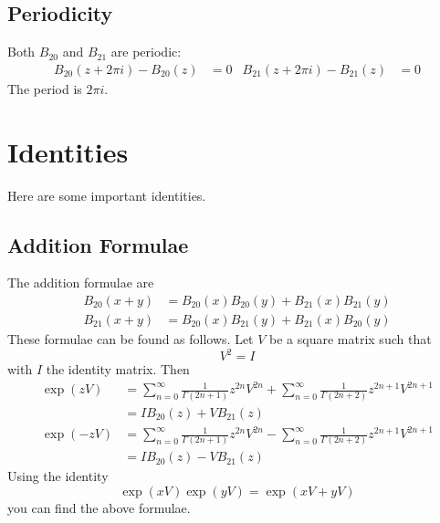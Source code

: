 \subsection{Periodicity}
Both $B_{20}$ and $B_{21}$ are periodic:
\begin{align}
    B_{20}(z + 2\pi i) - B_{20}(z) &= 0 & B_{21}(z + 2\pi i) - B_{21}(z) &= 0
\end{align}
The period is $2\pi i$.
\section{Identities}
Here are some important identities.
\subsection{Addition Formulae}
The addition formulae are
\begin{align}
    B_{20}(x + y) &= B_{20}(x) B_{20}(y) + B_{21}(x) B_{21}(y) \\
    B_{21}(x + y) &= B_{20}(x) B_{21}(y) + B_{21}(x) B_{20}(y)
\end{align}
These formulae can be found as follows. Let $V$ be a square matrix such that
\begin{equation}
    V^{2} = I
\end{equation}
with $I$ the identity matrix. Then
\begin{align}
    \exp\left( z V \right) &= \sum_{n = 0}^{\infty} \frac{1}{\Gamma(2n + 1)} z^{2n} V^{2n} + \sum_{n = 0}^{\infty} \frac{1}{\Gamma(2n + 2)} z^{2n+1} V^{2n+1} \\ &= I B_{20}(z) + V B_{21}(z) \\
    \exp\left( -z V \right) &= \sum_{n = 0}^{\infty} \frac{1}{\Gamma(2n + 1)} z^{2n} V^{2n} - \sum_{n = 0}^{\infty} \frac{1}{\Gamma(2n + 2)} z^{2n+1} V^{2n+1} \\ &= I B_{20}(z) - V B_{21}(z)
\end{align}
Using the identity
\begin{equation}
    \exp\left( x V \right) \exp\left( y V \right) = \exp\left( xV + yV \right)
\end{equation}
you can find the above formulae.
